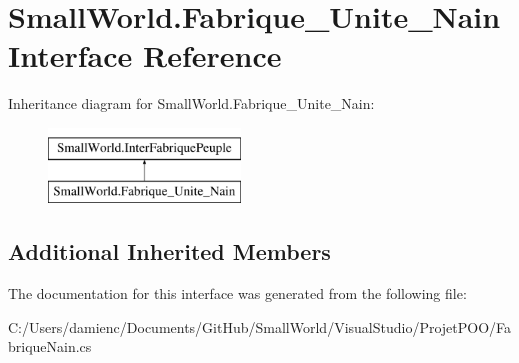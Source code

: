 \hypertarget{interface_small_world_1_1_fabrique___unite___nain}{\section{Small\-World.\-Fabrique\-\_\-\-Unite\-\_\-\-Nain Interface Reference}
\label{interface_small_world_1_1_fabrique___unite___nain}
}
Inheritance diagram for Small\-World.\-Fabrique\-\_\-\-Unite\-\_\-\-Nain\-:\begin{figure}[H]
\begin{center}
\leavevmode
\includegraphics[height=2.000000cm]{interface_small_world_1_1_fabrique___unite___nain}
\end{center}
\end{figure}
\subsection*{Additional Inherited Members}


The documentation for this interface was generated from the following file\-:\begin{DoxyCompactItemize}
\item 
C\-:/\-Users/damienc/\-Documents/\-Git\-Hub/\-Small\-World/\-Visual\-Studio/\-Projet\-P\-O\-O/Fabrique\-Nain.\-cs\end{DoxyCompactItemize}
